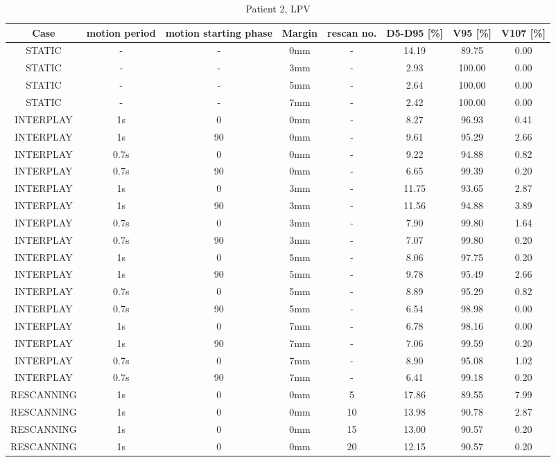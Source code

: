 \begin{table}[H]
  \centering
  \tiny
  \caption{Patient 2, LPV}
  \begin{tabular}{|c||c|c|c|c||c|c|c|}
    \hline\hline
    Case & motion period & motion starting phase & Margin & rescan no. & D5-D95 [\%] & V95 [\%] & V107 [\%] \\
    \hline 
STATIC & - & - & 0mm & - & 14.19 & 89.75 & 0.00 \\
STATIC & - & - & 3mm & - & 2.93 & 100.00 & 0.00 \\
STATIC & - & - & 5mm & - & 2.64 & 100.00 & 0.00 \\
STATIC & - & - & 7mm & - & 2.42 & 100.00 & 0.00 \\
INTERPLAY & 1s & 0 & 0mm & - & 8.27 & 96.93 & 0.41 \\
INTERPLAY & 1s & 90 & 0mm & - & 9.61 & 95.29 & 2.66 \\
INTERPLAY & 0.7s & 0 & 0mm & - & 9.22 & 94.88 & 0.82 \\
INTERPLAY & 0.7s & 90 & 0mm & - & 6.65 & 99.39 & 0.20 \\
INTERPLAY & 1s & 0 & 3mm & - & 11.75 & 93.65 & 2.87 \\
INTERPLAY & 1s & 90 & 3mm & - & 11.56 & 94.88 & 3.89 \\
INTERPLAY & 0.7s & 0 & 3mm & - & 7.90 & 99.80 & 1.64 \\
INTERPLAY & 0.7s & 90 & 3mm & - & 7.07 & 99.80 & 0.20 \\
INTERPLAY & 1s & 0 & 5mm & - & 8.06 & 97.75 & 0.20 \\
INTERPLAY & 1s & 90 & 5mm & - & 9.78 & 95.49 & 2.66 \\
INTERPLAY & 0.7s & 0 & 5mm & - & 8.89 & 95.29 & 0.82 \\
INTERPLAY & 0.7s & 90 & 5mm & - & 6.54 & 98.98 & 0.00 \\
INTERPLAY & 1s & 0 & 7mm & - & 6.78 & 98.16 & 0.00 \\
INTERPLAY & 1s & 90 & 7mm & - & 7.06 & 99.59 & 0.20 \\
INTERPLAY & 0.7s & 0 & 7mm & - & 8.90 & 95.08 & 1.02 \\
INTERPLAY & 0.7s & 90 & 7mm & - & 6.41 & 99.18 & 0.20 \\
RESCANNING & 1s & 0 & 0mm & 5 & 17.86 & 89.55 & 7.99 \\
RESCANNING & 1s & 0 & 0mm & 10 & 13.98 & 90.78 & 2.87 \\
RESCANNING & 1s & 0 & 0mm & 15 & 13.00 & 90.57 & 0.20 \\
RESCANNING & 1s & 0 & 0mm & 20 & 12.15 & 90.57 & 0.20 \\

\end{tabular}
\end{table}
